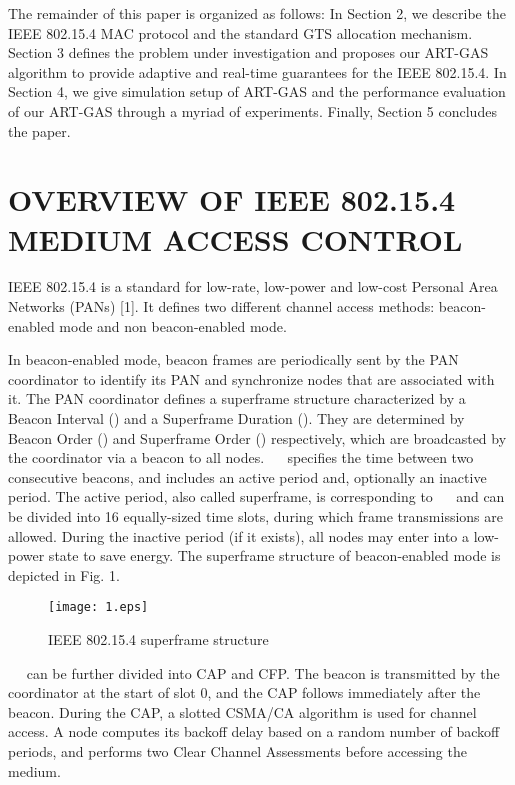 \documentclass[letterpaper]{sig-alternate-10pt}
\begin{document}
The remainder of this paper is organized as follows: In Section 2, we describe the IEEE 802.15.4 MAC protocol and the standard GTS allocation mechanism. Section 3 defines the problem under investigation and proposes our ART-GAS algorithm to provide adaptive and real-time guarantees for the IEEE 802.15.4. In Section 4, we give simulation setup of ART-GAS and the performance evaluation of our ART-GAS through a myriad of experiments. Finally, Section 5 concludes the paper.

\section{OVERVIEW OF IEEE 802.15.4 MEDIUM ACCESS CONTROL}
IEEE 802.15.4 is a standard for low-rate, low-power and low-cost Personal Area Networks (PANs) [1]. It defines two different channel access methods: beacon-enabled mode and non beacon-enabled mode.

In beacon-enabled mode, beacon frames are periodically sent by the PAN coordinator to identify its PAN and synchronize nodes that are associated with it. The PAN coordinator defines a superframe structure characterized by a Beacon Interval () and a Superframe Duration (). They are determined by Beacon Order () and Superframe Order () respectively, which are broadcasted by the coordinator via a beacon to all nodes. ~~ specifies the time between two consecutive beacons, and includes an active period and, optionally an inactive period. The active period, also called superframe, is corresponding to ~~ and can be divided into 16 equally-sized time slots, during which frame transmissions are allowed. During the inactive period (if it exists), all nodes may enter into a low-power state to save energy. The superframe structure of beacon-enabled mode is depicted in Fig. 1.

\begin{figure}[!t]
\setlength{\abovecaptionskip}{5pt}
\setlength{\belowcaptionskip}{5pt}
\renewcommand{\captionfont}{\bfseries}
\centering
\texttt{[image: 1.eps]}
\centering
\caption{IEEE 802.15.4 superframe structure}
\label{fig_sim}
\end{figure}

~~ can be further divided into CAP and CFP. The beacon is transmitted by the coordinator at the start of slot 0, and the CAP follows immediately after the beacon. During the CAP, a slotted CSMA/CA algorithm is used for channel access. A node computes its backoff delay based on a random number of backoff periods, and performs two Clear Channel Assessments before accessing the medium.
\end{document}
